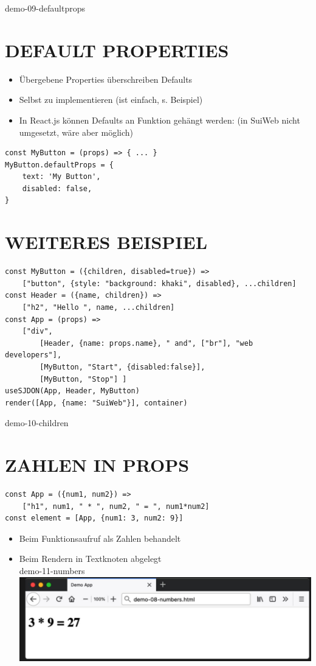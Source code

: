 \documentclass[10pt]{article}
\begin{document}
demo-09-defaultprops

\section*{DEFAULT PROPERTIES}
\begin{itemize}
  \item Übergebene Properties überschreiben Defaults
  \item Selbst zu implementieren (ist einfach, s. Beispiel)
  \item In React.js können Defaults an Funktion gehängt werden: (in SuiWeb nicht umgesetzt, wäre aber möglich)
\end{itemize}

\begin{verbatim}
const MyButton = (props) => { ... }
MyButton.defaultProps = {
    text: 'My Button',
    disabled: false,
}
\end{verbatim}

\section*{WEITERES BEISPIEL}
\begin{verbatim}
const MyButton = ({children, disabled=true}) =>
    ["button", {style: "background: khaki", disabled}, ...children]
const Header = ({name, children}) =>
    ["h2", "Hello ", name, ...children]
const App = (props) =>
    ["div",
        [Header, {name: props.name}, " and", ["br"], "web developers"],
        [MyButton, "Start", {disabled:false}],
        [MyButton, "Stop"] ]
useSJDON(App, Header, MyButton)
render([App, {name: "SuiWeb"}], container)
\end{verbatim}

demo-10-children

\section*{ZAHLEN IN PROPS}
\begin{verbatim}
const App = ({num1, num2}) =>
    ["h1", num1, " * ", num2, " = ", num1*num2]
const element = [App, {num1: 3, num2: 9}]
\end{verbatim}

\begin{itemize}
  \item Beim Funktionsaufruf als Zahlen behandelt
  \item Beim Rendern in Textknoten abgelegt\\
demo-11-numbers\\
\includegraphics[max width=\textwidth, center]{2025_01_02_254b5e4c52d090c313e1g-40}
\end{itemize}
\end{document}
